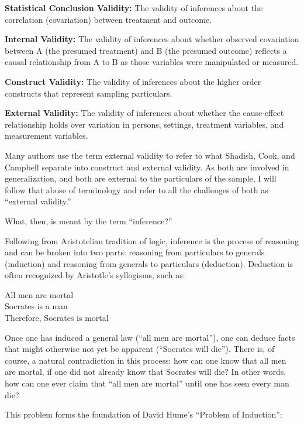 \documentclass[a4paper,12pt]{article}
\begin{document}
\begin{displayquote}
\textbf{Statistical Conclusion Validity:} The validity of inferences about the correlation (covariation) between treatment and outcome.

\textbf{Internal Validity:} The validity of inferences about whether observed covariation between A (the presumed treatment) and B (the presumed outcome) reflects a causal relationship from A to B as those variables were manipulated or measured.

\textbf{Construct Validity:} The validity of inferences about the higher order constructs that represent sampling particulars.

\textbf{External Validity:} The validity of inferences about whether the cause-effect relationship holds over variation in persons, settings, treatment variables, and measurement variables.
\end{displayquote}

Many authors use the term external validity to refer to what Shadish, Cook, and Campbell separate into construct and external validity. As both are involved in generalization, and both are external to the particulars of the sample, I will follow that abuse of terminology and refer to all the challenges of both as ``external validity.''

What, then, is meant by the term ``inference?''

Following from Aristotelian tradition of logic, inference is the process of reasoning and can be broken into two parts: reasoning from particulars to generals (induction) and reasoning from generals to particulars (deduction). Deduction is often recognized by Aristotle's syllogisms, such as:

\begin{displayquote}
All men are mortal \\
Socrates is a man  \\
Therefore, Socrates is mortal
\end{displayquote}

Once one has induced a general law (``all men are mortal''), one can deduce facts that might otherwise not yet be apparent (``Socrates will die''). There is, of course, a natural contradiction in this process: how can one know that all men are mortal, if one did not already know that Socrates will die? In other words, how can one ever claim that ``all men are mortal'' until one has seen every man die?

This problem forms the foundation of David Hume's ``Problem of Induction'':
\end{document}
